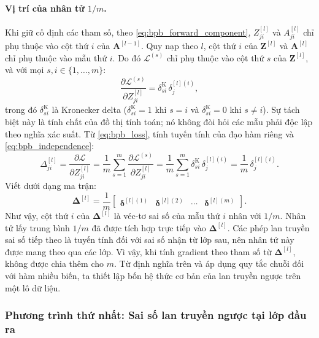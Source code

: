 \paragraph{Vị trí của nhân tử $1/m$.} %
Khi giữ cố định các tham số, theo \eqref{eq:bpb_forward_component}, $Z_{ji}^{[l]}$ và $A_{ji}^{[l]}$ chỉ phụ thuộc vào cột thứ $i$ của $\mathbf{A}^{[l-1]}$. Quy nạp theo $l$, cột thứ $i$ của $\mathbf{Z}^{[l]}$ và $\mathbf{A}^{[l]}$ chỉ phụ thuộc vào mẫu thứ $i$. Do đó $\mathcal{L}^{(s)}$ chỉ phụ thuộc vào cột thứ $s$ của $\mathbf{Z}^{[l]}$, và với mọi $s, i \in \{1,\dots,m\}$:
\begin{equation}
\frac{\partial\mathcal{L}^{(s)}}{\partial Z_{ji}^{[l]}} = \delta^{\mathrm{K}}_{si}\,\delta_j^{[l](i)},
\label{eq:bpb_independence}
\end{equation}
trong đó $\delta^{\mathrm{K}}_{si}$ là Kronecker delta ($\delta^{\mathrm{K}}_{si} = 1$ khi $s = i$ và $\delta^{\mathrm{K}}_{si} = 0$ khi $s \neq i$). Sự tách biệt này là tính chất của đồ thị tính toán; nó không đòi hỏi các mẫu phải độc lập theo nghĩa xác suất. Từ \eqref{eq:bpb_loss}, tính tuyến tính của đạo hàm riêng và \eqref{eq:bpb_independence}:
\begin{equation}
\Delta_{ji}^{[l]} = \frac{\partial\mathcal{L}}{\partial Z_{ji}^{[l]}}
= \frac{1}{m}\sum_{s=1}^{m}\frac{\partial\mathcal{L}^{(s)}}{\partial Z_{ji}^{[l]}}
= \frac{1}{m}\sum_{s=1}^{m}\delta^{\mathrm{K}}_{si}\,\delta_j^{[l](i)}
= \frac{1}{m}\,\delta_j^{[l](i)}.
\end{equation}
Viết dưới dạng ma trận:
\begin{equation}
\boldsymbol{\Delta}^{[l]} = \frac{1}{m}\begin{bmatrix} \boldsymbol{\delta}^{[l](1)} & \boldsymbol{\delta}^{[l](2)} & \cdots & \boldsymbol{\delta}^{[l](m)} \end{bmatrix}.
\label{eq:bpb_delta_columns}
\end{equation}
Như vậy, cột thứ $i$ của $\boldsymbol{\Delta}^{[l]}$ là véc-tơ sai số của mẫu thứ $i$ nhân với $1/m$. Nhân tử lấy trung bình $1/m$ đã được tích hợp trực tiếp vào $\boldsymbol{\Delta}^{[l]}$. Các phép lan truyền sai số tiếp theo là tuyến tính đối với sai số nhận từ lớp sau, nên nhân tử này được mang theo qua các lớp. Vì vậy, khi tính gradient theo tham số từ $\boldsymbol{\Delta}^{[l]}$, không được chia thêm cho $m$. Từ định nghĩa trên và áp dụng quy tắc chuỗi đối với hàm nhiều biến, ta thiết lập bốn hệ thức cơ bản của lan truyền ngược trên một lô dữ liệu.

\subsubsection{Phương trình thứ nhất: Sai số lan truyền ngược tại lớp đầu ra}
 
